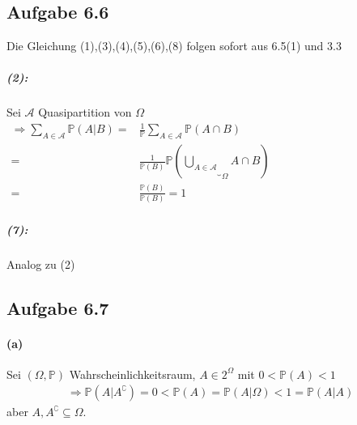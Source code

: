 \documentclass[10pt, a4paper]{article}
\begin{document}
\subsection{Aufgabe 6.6}
Die Gleichung (1),(3),(4),(5),(6),(8) folgen sofort aus 6.5(1) und 3.3
\subparagraph{(2):} Sei $\mathcal{A}$ Quasipartition von $\Omega$
\begin{align*}
	\Rightarrow \sum_{A\in\mathcal{A}}\mathbb{P}(A|B)=&\frac{1}{\mathbb{P}}\sum_{A\in\mathcal{A}}\mathbb{P}(A\cap B)	\hspace{200pt}\\
	=&\frac{1}{\mathbb{P}(B)}\mathbb{P}(\underbrace{\underset{A\in\mathcal{A}}{\bigcup}}_{\Omega}A\cap B)	\\
	=&\frac{\mathbb{P}(B)}{\mathbb{P}(B)}=1
\end{align*}

\subparagraph*{(7):} Analog zu (2)

\subsection{Aufgabe 6.7}
\paragraph*{(a)} Sei $(\Omega, \mathbb{P})$ Wahrscheinlichkeitsraum, $A\in2^{\Omega}$ mit $0<\mathbb{P}(A)<1$
\begin{align*}
	\Rightarrow \mathbb{P}(A|A^{\complement})=0<\mathbb{P}(A)=\mathbb{P}(A|\Omega)<1=\mathbb{P}(A|A)
\end{align*}
aber $A,A^{\complement}\subseteq\Omega$.
\end{document}
